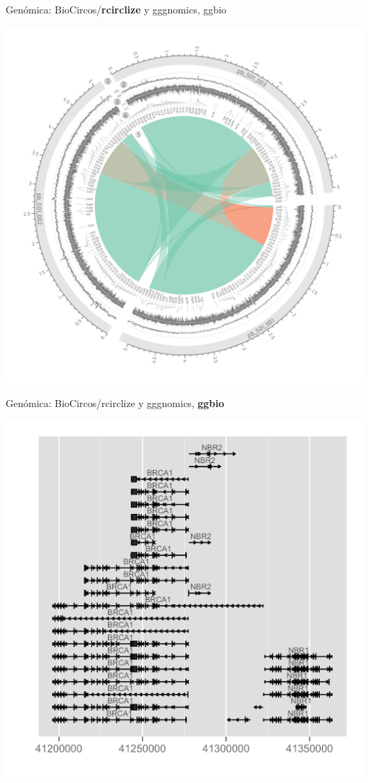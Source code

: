 \documentclass[
  10pt,
  ignorenonframetext,
]{beamer}
\begin{document}
\begin{frame}{Genómica: BioCircos/\textbf{rcirclize} y gggnomics, ggbio}
\protect\hypertarget{genuxf3mica-biocircosrcirclize-y-gggnomics-ggbio}{}
\begin{center}\includegraphics[width=0.7\linewidth]{../../imgs/rcirclize} \end{center}
\end{frame}

\begin{frame}{Genómica: BioCircos/rcirclize y gggnomics, \textbf{ggbio}}
\protect\hypertarget{genuxf3mica-biocircosrcirclize-y-gggnomics-ggbio-1}{}
\begin{center}\includegraphics[width=0.7\linewidth]{../../imgs/ggnomics_1} \end{center}
\end{frame}
\end{document}
